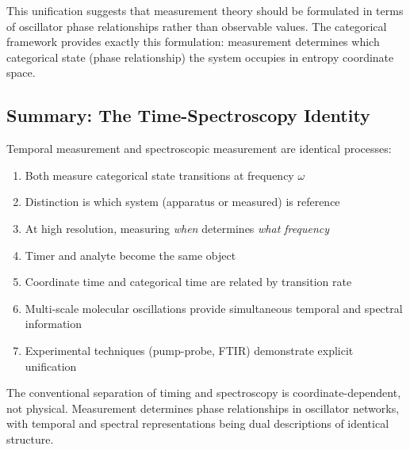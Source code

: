 This unification suggests that measurement theory should be formulated in terms of oscillator phase relationships rather than observable values. The categorical framework provides exactly this formulation: measurement determines which categorical state (phase relationship) the system occupies in entropy coordinate space.

\subsection{Summary: The Time-Spectroscopy Identity}

Temporal measurement and spectroscopic measurement are identical processes:
\begin{enumerate}
\item Both measure categorical state transitions at frequency $\omega$
\item Distinction is which system (apparatus or measured) is reference
\item At high resolution, measuring \textit{when} determines \textit{what frequency}
\item Timer and analyte become the same object
\item Coordinate time and categorical time are related by transition rate
\item Multi-scale molecular oscillations provide simultaneous temporal and spectral information
\item Experimental techniques (pump-probe, FTIR) demonstrate explicit unification
\end{enumerate}

The conventional separation of timing and spectroscopy is coordinate-dependent, not physical. Measurement determines phase relationships in oscillator networks, with temporal and spectral representations being dual descriptions of identical structure.
